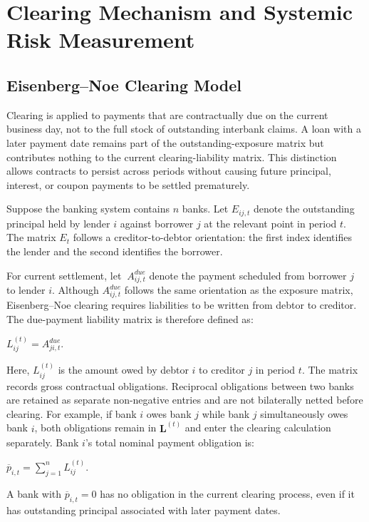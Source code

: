 \chapter{Clearing Mechanism and Systemic Risk Measurement}

\section{Eisenberg--Noe Clearing Model}

Clearing is applied to payments that are contractually due on the
current business day, not to the full stock of outstanding interbank
claims. A loan with a later payment date remains part of the
outstanding-exposure matrix but contributes nothing to the current
clearing-liability matrix. This distinction allows contracts to persist
across periods without causing future principal, interest, or coupon
payments to be settled prematurely.

Suppose the banking system contains \(n\) banks. Let \(E_{ij,t}\) denote
the outstanding principal held by lender \(i\) against borrower \(j\) at
the relevant point in period \(t\). The matrix \(E_{t}\) follows a
creditor-to-debtor orientation: the first index identifies the lender
and the second identifies the borrower.

For current settlement, let \(\ A_{ij,t}^{due}\) denote the payment
scheduled from borrower \(j\) to lender \(i\). Although
\(A_{ij,t}^{due}\) follows the same orientation as the exposure matrix,
Eisenberg--Noe clearing requires liabilities to be written from debtor
to creditor. The due-payment liability matrix is therefore defined as:

\(L_{ij}^{(t)} = A_{ji,t}^{due}\).

Here, \(L_{ij}^{(t)}\) is the amount owed by debtor \(i\) to creditor
\(j\) in period \(t\). The matrix records gross contractual obligations. Reciprocal obligations
between two banks are retained as separate non-negative entries and are
not bilaterally netted before clearing. For example, if bank $i$ owes
bank $j$ while bank $j$ simultaneously owes bank $i$, both obligations
remain in $\mathbf{L}^{(t)}$ and enter the clearing calculation separately. Bank \(i\)'s total nominal payment obligation is:

\({\overline{p}}_{i,t} = \sum_{j = 1}^{n}L_{ij}^{(t)}\).

A bank with \({\overline{p}}_{i,t} = 0\) has no obligation in the current
clearing process, even if it has outstanding principal associated with
later payment dates.

